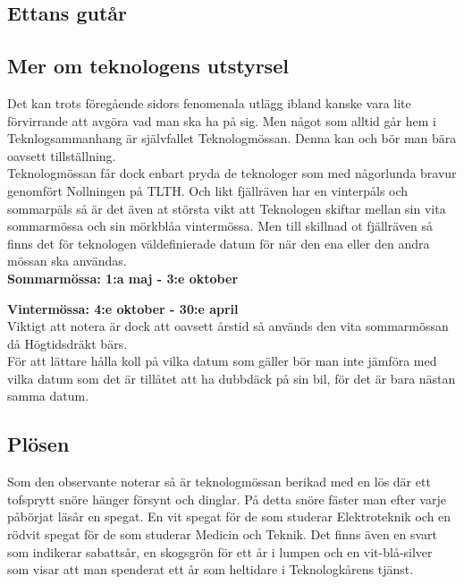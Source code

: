 \subsection*{Ettans gutår}


\newpage

\subsection*{Mer om teknologens utstyrsel}
Det kan trots föregående sidors fenomenala utlägg ibland kanske vara lite förvirrande att avgöra vad man ska ha på sig.
Men något som alltid går hem i Teknlogsammanhang är självfallet Teknologmössan.
Denna kan och bör man bära oavsett tillställning.
\\

Teknologmössan får dock enbart pryda de teknologer som med någorlunda bravur genomfört Nollningen på TLTH.
Och likt fjällräven har en vinterpåls och sommarpäls så är det även at största vikt att Teknologen skiftar mellan sin vita sommarmössa och sin mörkblåa vintermössa.
Men till skillnad ot fjällräven så finns det för teknologen väldefinierade datum för när den ena eller den andra mössan ska användas.
\\

\textbf{Sommarmössa: 1:a maj - 3:e oktober}

\textbf{Vintermössa: 4:e oktober - 30:e april}
\\

Viktigt att notera är dock att oavsett årstid så används den vita sommarmössan då Högtidsdräkt bärs.
\\

För att lättare hålla koll på vilka datum som gäller bör man inte jämföra med vilka datum som det är tillåtet att ha dubbdäck på sin bil, för det är bara nästan samma datum.

\newpage

\subsection*{Plösen}
Som den observante noterar så är teknologmössan berikad med en lös där ett tofsprytt snöre hänger försynt och dinglar.
På detta snöre fäster man efter varje påbörjat läsår en spegat. En vit spegat för de som studerar Elektroteknik och en rödvit spegat för de som studerar Medicin och Teknik.
Det finns även en svart som indikerar sabattsår, en skogsgrön för ett år i lumpen och en vit-blå-silver som visar att man spenderat ett år som heltidare i Teknologkårens tjänst.
\\

